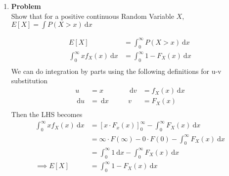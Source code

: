 \documentclass[12pt]{article}
\newenvironment{Ex}{\textbf{Problem}\vspace{.75em}\\}{}
\newcommand{\dd}[1]{\:\mathrm{d}{#1}}
\begin{document}
\begin{enumerate}
\begin{Ex}
\begin{solution}
\begin{enumerate}
\begin{equation}
\begin{aligned}
            &= \int_0^\infty x \cdot f_X(x) \dd{x} + \int_0^\infty y
            \cdot f_Y(y) \dd{y} \\
            \implies E[X +Y] &= \frac{5}{6}
          \end{aligned}
        \end{equation}
      \end{enumerate}
    \end{solution}
  \end{Ex}
\item
  \begin{Ex}
    Show that for a positive continuous Random Variable $X$, $E[X] =
    \int P(X > x) \dd{x}$
    \begin{solution} \hfill
      \begin{equation}
        \begin{aligned}
          \label{eq:7-sol}
          E[X] &= \int_{0}^{\infty} P(X > x) \dd{x} \\
          \int_{0}^{\infty} x f_X(x) \dd{x} &=
          \int_{0}^{\infty} 1 - F_X(x) \dd{x} \\
        \end{aligned}
      \end{equation}
      We can do integration by parts using the following definitions for
      u-v substitution
      \begin{equation}
        \label{eq:7-u-sub}
        \begin{aligned}
          u &= x \quad&\quad \dd{v}&=f_X(x)\dd{x} \\
          \dd{u}&=\dd{x} \quad&\quad v&=F_X(x) \\
        \end{aligned}
      \end{equation}
      Then the LHS becomes
      \begin{equation}
        \label{eq:7-sol-continued}
        \begin{aligned}
          \int_{0}^{\infty} x f_X(x) \dd{x} &=
          [x\cdot F_x(x)]_{0}^{\infty} - \int_{0}^{\infty}F_X(x)\dd{x} \\
          &= \infty\cdot F(\infty)-0\cdot F(0)-\int_{0}^{\infty}F_X(x)\dd{x} \\
          &= \int_0^{\infty}1\dd{x} - \int_{0}^{\infty}F_X(x)\dd{x} \\
          \implies E[X] &= \int_{0}^{\infty}1-F_X(x)\dd{x} \\
        \end{aligned}
      \end{equation}
    \end{solution}
  \end{Ex}
\end{enumerate}
\end{document}
